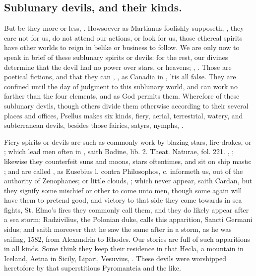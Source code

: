 {{\subsection{Sublunary devils, and their kinds.}
But be they more or less, . Howsoever as Martianus foolishly supposeth, , they care not for us, do not attend
our actions, or look for us, those ethereal spirits have other worlds
to reign in belike or business to follow. We are only now to speak in
brief of these sublunary spirits or devils: for the rest, our divines
determine that the devil had no power over stars, or heavens;
, \etc{}. Those are poetical
fictions, and that they can , \etc{}, as Canadia in \Horace{}, 'tis all false. They are confined
until the day of judgment to this sublunary world, and can work no
farther than the four elements, and as God permits them. Wherefore of
these sublunary devils, though others divide them otherwise according
to their several places and offices, Psellus makes six kinds, fiery,
aerial, terrestrial, watery, and subterranean devils, besides those
fairies, satyrs, nymphs, \etc{}.

Fiery spirits or devils are such as commonly work by blazing stars,
fire-drakes, or ; which lead men often in , saith Bodine, lib. 2. Theat. Naturae, fol. 221. , \etc{}; likewise they
counterfeit suns and moons, stars oftentimes, and sit on ship masts: ; and are called , as Eusebius
l. contra Philosophos, c.  informeth us, out of the authority of
Zenophanes; or little clouds, ; which
never appear, saith Cardan, but they signify some mischief or other to
come unto men, though some again will have them to pretend good, and
victory to that side they come towards in sea fights, St. Elmo's fires
they commonly call them, and they do likely appear after a sea storm;
Radzivilius, the Polonian duke, calls this apparition, Sancti Germani
sidus; and saith moreover that he saw the same after in a storm, as he
was sailing, 1582, from Alexandria to Rhodes. Our stories are
full of such apparitions in all kinds. Some think they keep their
residence in that Hecla, a mountain in Iceland, Aetna in Sicily,
Lipari, Vesuvius, \etc{}. These devils were worshipped heretofore by that
superstitious Pyromanteia and the like.

}}
